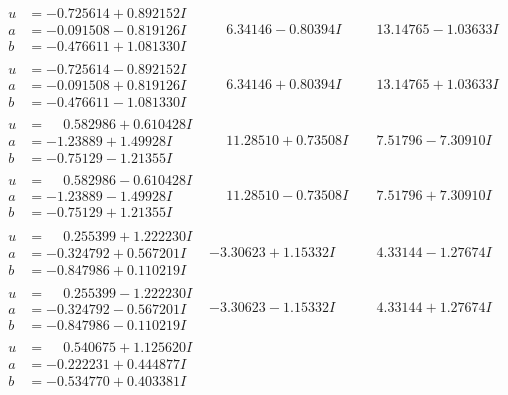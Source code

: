 \documentclass[1p]{elsarticle_modified}
\theoremstyle{definition}
\begin{document}
$$\begin{array}{c|c|c}
\begin{aligned}
u &= -0.725614 + 0.892152 I \\
a &= -0.091508 - 0.819126 I \\
b &= -0.476611 + 1.081330 I\end{aligned}
 & \phantom{-}6.34146 - 0.80394 I & \phantom{-}13.14765 - 1.03633 I \\ \hline\begin{aligned}
u &= -0.725614 - 0.892152 I \\
a &= -0.091508 + 0.819126 I \\
b &= -0.476611 - 1.081330 I\end{aligned}
 & \phantom{-}6.34146 + 0.80394 I & \phantom{-}13.14765 + 1.03633 I \\ \hline\begin{aligned}
u &= \phantom{-}0.582986 + 0.610428 I \\
a &= -1.23889 + 1.49928 I \\
b &= -0.75129 - 1.21355 I\end{aligned}
 & \phantom{-}11.28510 + 0.73508 I & \phantom{-}7.51796 - 7.30910 I \\ \hline\begin{aligned}
u &= \phantom{-}0.582986 - 0.610428 I \\
a &= -1.23889 - 1.49928 I \\
b &= -0.75129 + 1.21355 I\end{aligned}
 & \phantom{-}11.28510 - 0.73508 I & \phantom{-}7.51796 + 7.30910 I \\ \hline\begin{aligned}
u &= \phantom{-}0.255399 + 1.222230 I \\
a &= -0.324792 + 0.567201 I \\
b &= -0.847986 + 0.110219 I\end{aligned}
 & -3.30623 + 1.15332 I & \phantom{-}4.33144 - 1.27674 I \\ \hline\begin{aligned}
u &= \phantom{-}0.255399 - 1.222230 I \\
a &= -0.324792 - 0.567201 I \\
b &= -0.847986 - 0.110219 I\end{aligned}
 & -3.30623 - 1.15332 I & \phantom{-}4.33144 + 1.27674 I \\ \hline\begin{aligned}
u &= \phantom{-}0.540675 + 1.125620 I \\
a &= -0.222231 + 0.444877 I \\
b &= -0.534770 + 0.403381 I\end{aligned}

\end{array}$$
\end{document}
